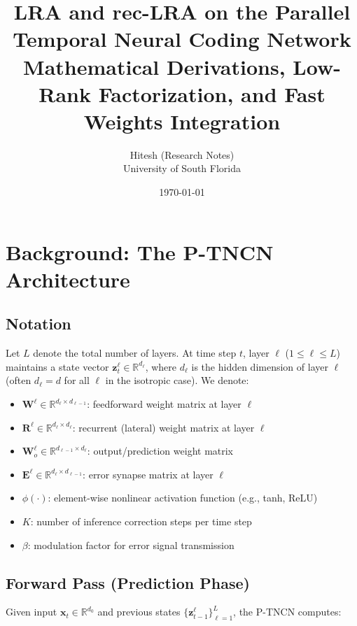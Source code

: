\documentclass[11pt]{article}
\title{\textbf{LRA and rec-LRA on the Parallel Temporal Neural Coding Network}\\
  \large Mathematical Derivations, Low-Rank Factorization, and Fast Weights Integration}
\author{Hitesh (Research Notes) \\ \small University of South Florida}
\date{\today}
\theoremstyle{definition}
\newcommand{\vz}{\mathbf{z}}
\newcommand{\vx}{\mathbf{x}}
\newcommand{\W}{\mathbf{W}}
\newcommand{\R}{\mathbf{R}}
\newcommand{\E}{\mathbf{E}}
\newcommand{\Rbb}{\mathbb{R}}
\begin{document}
\maketitle
\tableofcontents
\newpage

\section{Background: The P-TNCN Architecture}

\subsection{Notation}

Let $L$ denote the total number of layers. At time step $t$, layer $\ell$
($1 \le \ell \le L$) maintains a state vector $\vz^\ell_t \in \Rbb^{d_\ell}$,
where $d_\ell$ is the hidden dimension of layer $\ell$ (often $d_\ell = d$
for all $\ell$ in the isotropic case). We denote:

\begin{itemize}
  \item $\W^\ell \in \Rbb^{d_\ell \times d_{\ell-1}}$: feedforward weight matrix at layer $\ell$
  \item $\R^\ell \in \Rbb^{d_\ell \times d_\ell}$: recurrent (lateral) weight matrix at layer $\ell$
  \item $\W^\ell_o \in \Rbb^{d_{\ell-1} \times d_\ell}$: output/prediction weight matrix
  \item $\E^\ell \in \Rbb^{d_\ell \times d_{\ell-1}}$: error synapse matrix at layer $\ell$
  \item $\phi(\cdot)$: element-wise nonlinear activation function (e.g., tanh, ReLU)
  \item $K$: number of inference correction steps per time step
  \item $\beta$: modulation factor for error signal transmission
\end{itemize}

\subsection{Forward Pass (Prediction Phase)}

Given input $\vx_t \in \Rbb^{d_0}$ and previous states
$\{\vz^\ell_{t-1}\}^L_{\ell=1}$, the P-TNCN computes:
\end{document}
